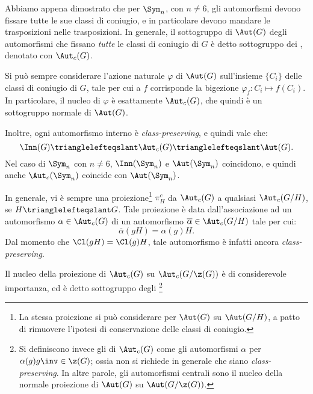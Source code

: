 \documentclass[11pt]{scrartcl}
\begin{document}
	\begin{approf}
		Abbiamo appena dimostrato che per $\Sym_n$, con $n \neq 6$, gli automorfismi
		devono fissare tutte le sue classi di coniugio, e in particolare devono
		mandare le trasposizioni nelle trasposizioni. In generale, il sottogruppo
		di $\Aut(G)$ degli automorfismi che fissano \textit{tutte} le classi
		di coniugio di $G$ è detto sottogruppo dei , denotato con $\Aut_c(G)$. \medskip
		
		
		Si può sempre considerare l'azione naturale $\varphi$ di $\Aut(G)$ sull'insieme $\{C_i\}$ delle
		classi di coniugio di $G$, tale per cui a $f$ corrisponde la bigezione
		$\varphi_f : C_i \mapsto f(C_i)$. In particolare, il nucleo di $\varphi$ è
		esattamente $\Aut_c(G)$, che quindi è un sottogruppo normale di $\Aut(G)$. \medskip
		
		
		Inoltre, ogni automorfismo interno è \textit{class-preserving}, e quindi
		vale che:
		\[ \Inn(G) \trianglelefteqslant \Aut_c(G) \trianglelefteqslant \Aut(G). \]
		Nel caso di $\Sym_n$ con $n \neq 6$, $\Inn(\Sym_n)$ e
		$\Aut(\Sym_n)$ coincidono, e quindi anche $\Aut_c(\Sym_n)$ coincide
		con $\Aut(\Sym_n)$. \medskip
		
		
		In generale, vi è sempre una proiezione\footnote{
			La stessa proiezione si può considerare per $\Aut(G)$ su
			$\Aut(G/H)$, a patto di rimuovere l'ipotesi di
			conservazione delle classi di coniugio.
		} $\pi_{H}^c$ da $\Aut_c(G)$ a qualsiasi
		$\Aut_c(G/H)$, se $H \trianglelefteqslant G$. Tale proiezione è data
		dall'associazione ad un automorfismo $\alpha \in \Aut_c(G)$ di
		un automorfismo $\overline{\alpha} \in \Aut_c(G/H)$ tale per cui:
		\[ \overline{\alpha}(gH) = \alpha(g)H. \]
		Dal momento che $\Cl(gH) = \Cl(g) H$, tale automorfismo è infatti
		ancora \textit{class-preserving}. \medskip
		
		
		Il nucleo della proiezione di $\Aut_c(G)$ su $\Aut_c(G/\z(G))$ è
		di considerevole importanza, ed è detto sottogruppo degli
		\footnote{
			Si definiscono invece gli  di $\Aut_c(G)$ come
			gli automorfismi $\alpha$ per $\alpha(g) g\inv \in \z(G)$; ossia
			non si richiede in generale che siano \textit{class-preserving}. In
			altre parole, gli automorfismi centrali sono il nucleo della
			normale proiezione di $\Aut(G)$ su $\Aut(G/\z(G))$.
			
}
\end{approf}
\end{document}
